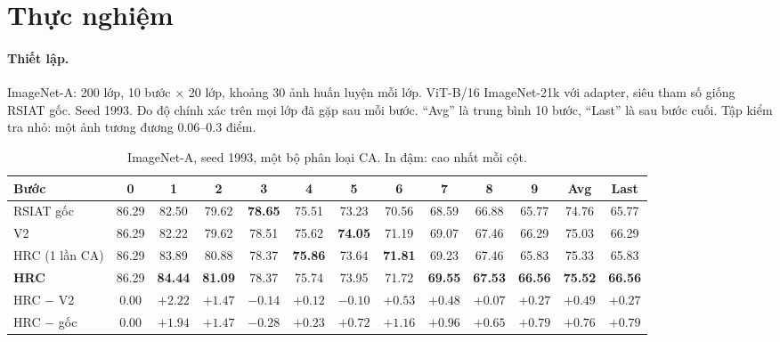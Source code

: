 \documentclass[11pt]{article}
\begin{document}
\section{Thực nghiệm}

\paragraph{Thiết lập.} ImageNet-A: 200 lớp, 10 bước $\times$ 20 lớp, khoảng 30 ảnh huấn luyện mỗi lớp. ViT-B/16
ImageNet-21k với adapter, siêu tham số giống RSIAT gốc. Seed 1993. Đo độ chính xác trên mọi lớp đã gặp sau mỗi bước.
``Avg'' là trung bình 10 bước, ``Last'' là sau bước cuối. Tập kiểm tra nhỏ: một ảnh tương đương $0.06$--$0.3$ điểm.

\begin{table}[H]
\centering\small
\caption{ImageNet-A, seed 1993, một bộ phân loại CA. In đậm: cao nhất mỗi cột.}
\setlength{\tabcolsep}{3.5pt}
\begin{tabular}{l*{10}{c}cc}
\toprule
Bước & 0 & 1 & 2 & 3 & 4 & 5 & 6 & 7 & 8 & 9 & Avg & Last\\
\midrule
RSIAT gốc & 86.29 & 82.50 & 79.62 & \textbf{78.65} & 75.51 & 73.23 & 70.56 & 68.59 & 66.88 & 65.77 & 74.76 & 65.77\\
V2 & 86.29 & 82.22 & 79.62 & 78.51 & 75.62 & \textbf{74.05} & 71.19 & 69.07 & 67.46 & 66.29 & 75.03 & 66.29\\
HRC (1 lần CA) & 86.29 & 83.89 & 80.88 & 78.37 & \textbf{75.86} & 73.64 & \textbf{71.81} & 69.23 & 67.46 & 65.83 & 75.33 & 65.83\\
\textbf{HRC} & 86.29 & \textbf{84.44} & \textbf{81.09} & 78.37 & 75.74 & 73.95 & 71.72 & \textbf{69.55} & \textbf{67.53} & \textbf{66.56} & \textbf{75.52} & \textbf{66.56}\\
\midrule
HRC $-$ V2 & 0.00 & $+2.22$ & $+1.47$ & $-0.14$ & $+0.12$ & $-0.10$ & $+0.53$ & $+0.48$ & $+0.07$ & $+0.27$ & $+0.49$ & $+0.27$\\
HRC $-$ gốc & 0.00 & $+1.94$ & $+1.47$ & $-0.28$ & $+0.23$ & $+0.72$ & $+1.16$ & $+0.96$ & $+0.65$ & $+0.79$ & $+0.76$ & $+0.79$\\
\bottomrule
\end{tabular}
\end{table}
\end{document}
